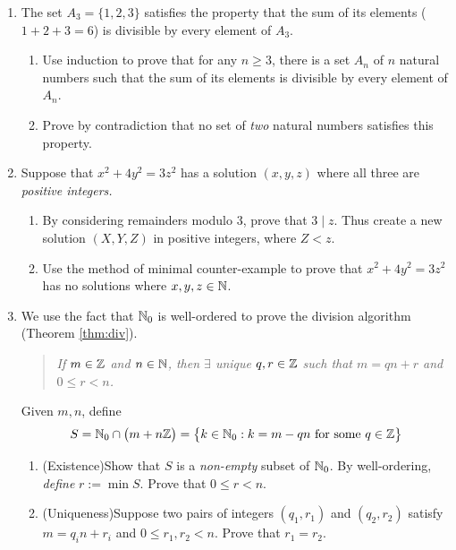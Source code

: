 \begin{exercises}
\begin{enumerate}
	
		\goodbreak
		
	
  	\item The set $A_3=\{1,2,3\}$ satisfies the property that the sum of its elements ($1+2+3=6$) is divisible by every element of $A_3$.
  	\begin{enumerate}
  	  \item Use induction to prove that for any $n\ge 3$, there is a set $A_n$ of $n$ natural numbers such that the sum of its elements is divisible by every element of $A_n$.
  	  \item Prove by contradiction that no set of \emph{two} natural numbers satisfies this property.
  	\end{enumerate}
 	
	
		
	
		\item Suppose that $x^2+4y^2=3z^2$ has a solution $(x,y,z)$ where all three are \emph{positive integers.}
		\begin{enumerate}
	  	\item By considering remainders modulo 3, prove that $3\mid z$. Thus create a new solution $(X,Y,Z)$ in positive integers, where $Z<z$.
	  	\item Use the method of minimal counter-example to prove that $x^2+4y^2=3z^2$ has no solutions where $x,y,z\in\mathbb{N}$.
		\end{enumerate}
  
	
		\item We use the fact that $\mathbb{N}_0$ is well-ordered to prove the division algorithm (Theorem \ref{thm:div}).
		\begin{quote}
			\emph{If $m\in\mathbb{Z}$ and $n\in\mathbb{N}$, then $\exists$ unique $q,r\in\mathbb{Z}$ such that $m=qn+r$ and $0\le r<n$.}
		\end{quote}
	
		Given $m,n$, define
		\[
			S=\mathbb{N}_0\cap\bigl(m+n\mathbb{Z}\bigr) =\bigl\{k\in\mathbb{N}_0:k=m-qn\text{ for some } q\in\mathbb{Z}\bigr\}
		\]	
		\begin{enumerate}
			\item (Existence)\lstsp Show that $S$ is a \emph{non-empty} subset of $\mathbb{N}_0$. By well-ordering, \emph{define} $r:=\min S$. Prove that $0\le r<n$.
			\item (Uniqueness)\lstsp Suppose two pairs of integers $(q_1,r_1)$ and $(q_2,r_2)$ satisfy $m=q_in+r_i$ and $0\le r_1,r_2<n$. Prove that $r_1=r_2$.
		\end{enumerate}
		

\end{enumerate}
\end{exercises}
